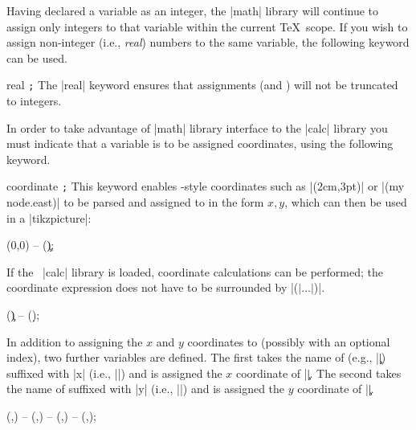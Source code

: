 Having declared a variable as an integer, the |math| library will continue to
assign only integers to that variable within the current \TeX\ scope. If you
wish to assign non-integer (i.e., \emph{real}) numbers to the same variable,
the following keyword can be used.

\begin{math-keyword}{{real} \texttt{;}}
    The |real| keyword ensures that assignments  (and
    ) will not be truncated to integers.
\end{math-keyword}

In order to take advantage of |math| library interface to the |calc| library
you must indicate that a variable is to be assigned coordinates, using the
following keyword.

\begin{math-keyword}{{coordinate} \texttt{;}}
    This keyword enables \tikzname-style coordinates such as |(2cm,3pt)| or
    |(my node.east)| to be parsed and assigned to  in the form
    $x,y$, which can then be used in a |tikzpicture|:
\begin{codeexample}[preamble={\usetikzlibrary{math}}]
\tikz\draw (0,0) -- (\c);
\end{codeexample}

    If the \tikzname\ |calc| library is loaded, coordinate calculations can be
    performed; the coordinate expression does not have to be surrounded by
    |($|\ldots|$)|.
\begin{codeexample}[preamble={\usetikzlibrary{math}}]
\tikz\draw (\c) -- (\d);
\end{codeexample}

    In addition to assigning the $x$ and $y$ coordinates to 
    (possibly with an optional index), two further variables are defined. The
    first takes the name of  (e.g., |\c|) suffixed with |x|
    (i.e., |\cx|) and is assigned the $x$ coordinate of |\c|. The second takes
    the name of  suffixed with |y| (i.e., |\cy|) and is assigned
    the $y$ coordinate of |\c|.
\begin{codeexample}[preamble={\usetikzlibrary{math}}]
\tikz\draw (,) -- (,) -- (,) -- (,);
\end{codeexample}
\end{math-keyword}

